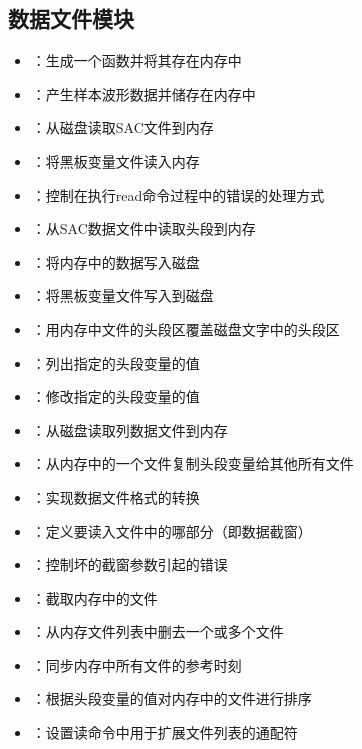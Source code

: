 \subsection*{数据文件模块}
\begin{itemize}
\item {}：生成一个函数并将其存在内存中
\item {}：产生样本波形数据并储存在内存中
\item {}：从磁盘读取SAC文件到内存
\item {}：将黑板变量文件读入内存
\item {}：控制在执行read命令过程中的错误的处理方式
\item {}：从SAC数据文件中读取头段到内存
\item {}：将内存中的数据写入磁盘
\item {}：将黑板变量文件写入到磁盘
\item {}：用内存中文件的头段区覆盖磁盘文字中的头段区
\item {}：列出指定的头段变量的值
\item {}：修改指定的头段变量的值
\item {}：从磁盘读取列数据文件到内存
\item {}：从内存中的一个文件复制头段变量给其他所有文件
\item {}：实现数据文件格式的转换
\item {}：定义要读入文件中的哪部分（即数据截窗）
\item {}：控制坏的截窗参数引起的错误
\item {}：截取内存中的文件
\item {}：从内存文件列表中删去一个或多个文件
\item {}：同步内存中所有文件的参考时刻
\item {}：根据头段变量的值对内存中的文件进行排序
\item {}：设置读命令中用于扩展文件列表的通配符
\end{itemize}

